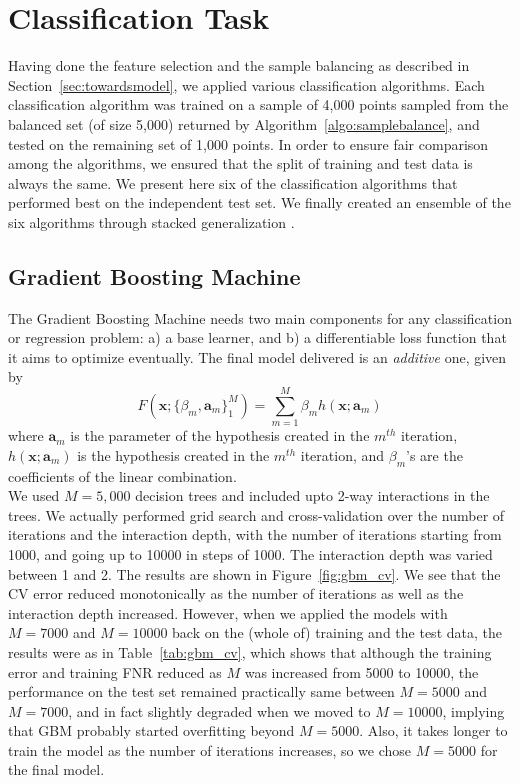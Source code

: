 \section{Classification Task}
\label{sec:classification}
Having done the feature selection and the sample balancing as described in Section~\ref{sec:towardsmodel}, we applied various classification algorithms. Each classification algorithm 
was trained on a sample of 4,000 points sampled from the balanced set (of size 5,000) returned by Algorithm~\ref{algo:samplebalance}, and tested on the remaining set of 1,000 points. In order to ensure fair comparison among the algorithms, we ensured that the split of training and test data is always the same. We present here six of the classification 
algorithms that performed best on the independent test set. We finally created an ensemble of the six algorithms through stacked generalization \cite{Wolpert92}.

\subsection{Gradient Boosting Machine}
\label{subsec:gbm}
The Gradient Boosting Machine \cite{Friedman01} needs two main components for any classification or regression problem: a) a base learner, and b) a differentiable loss function that it aims to optimize eventually. The final model delivered is an {\em additive} one, given by 
\begin{equation}
\label{eqn:additive}
F(\mathbf{x};\{{\beta}_m, \mathbf{a}_m\}_1^M) = \sum_{m=1}^M{\beta}_mh(\mathbf{x};{\mathbf{a}}_m)
\end{equation}
where ${\mathbf{a}}_m$ is the parameter of the hypothesis created in the $m^{th}$ iteration, $h(\mathbf{x};{\mathbf{a}}_m)$ is the hypothesis created in the $m^{th}$ iteration, and ${\beta}_m$'s are the coefficients of the linear combination.\\

We used $M = 5,000$ decision trees and included upto 2-way interactions in the trees. We actually performed grid search and cross-validation over the number of iterations and the interaction depth, with the number of iterations starting from 1000, and going up to 10000 in steps of 1000. The interaction depth was varied between 1 and 2. The results are shown in Figure~\ref{fig:gbm_cv}. We see that the CV error reduced monotonically as the number of iterations as well as the interaction depth increased. However, when we applied the models with $M = 7000$ and $M = 10000$ back on the (whole of) training and the test data, the results were as in Table~\ref{tab:gbm_cv}, which shows that although the training error and training FNR reduced as $M$ was increased from 5000 to 10000, the performance on the test set remained practically same between $M = 5000$ and $M = 7000$, and in fact slightly degraded when we moved to $M = 10000$, implying that GBM probably started overfitting beyond $M = 5000$. Also, it takes longer to train the model as the number of iterations increases, so we chose $M = 5000$ for the final model.\\

